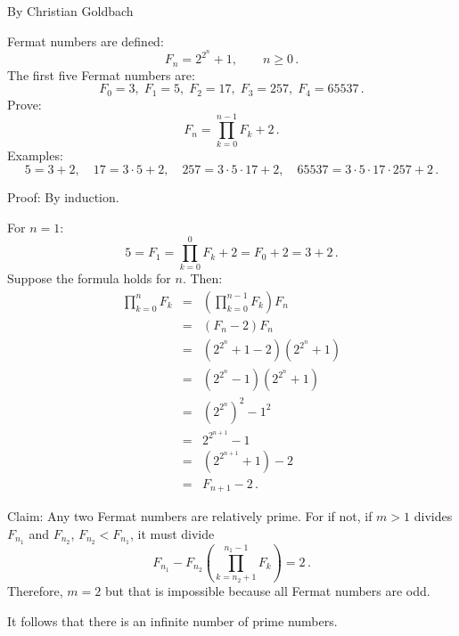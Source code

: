 \documentclass[11pt,a4paper]{report}
\begin{document}
\thispagestyle{empty}

By Christian Goldbach

Fermat numbers are defined:
\[
F_n=2^{2^n}+1,\quad\quad n\geq 0\,.
\]
The first five Fermat numbers are:
\[
F_0=3,\;F_1=5,\;F_2=17,\;F_3=257,\;F_4=65537\,.
\]
Prove:
\[
F_n = \prod_{k=0}^{n-1} F_k + 2\,.
\]
Examples:
\[
5=3+2,\quad 17=3\cdot 5+2,\quad 257=3\cdot 5\cdot 17+2,\quad 65537=3\cdot 5\cdot 17\cdot 257+2\,.
\]

Proof: By induction.

For $n=1$:
\[
5=F_1=\prod_{k=0}^{0} F_k + 2=F_0+2=3+2\,.
\]
Suppose the formula holds for $n$. Then:
\begin{eqnarray*}
\prod_{k=0}^{n}F_k
&=&(\prod_{k=0}^{n-1}F_k) F_n \\
&=& (F_n-2)F_n\\
&=& (2^{2^n}+1-2)(2^{2^n}+1)\\
&=&(2^{2^n}-1)(2^{2^n}+1)\\
&=& (2^{2^n})^2-1^2\\
&=& 2^{2^{n+1}}-1\\
&=& (2^{2^{n+1}}+1)-2\\
&=&F_{n+1}-2\,.
\end{eqnarray*}


Claim: Any two Fermat numbers are relatively prime. For if not, if $m>1$ divides $F_{n_1}$ and $F_{n_2}$, $F_{n_2} < F_{n_1}$, it must divide
\[
F_{n_1} - F_{n_2}\left(\prod_{k=n_2+1}^{n_1-1}F_k\right) = 2\,.
\]
Therefore, $m=2$ but that is impossible because all Fermat numbers are odd.

It follows that there is an infinite number of prime numbers.
\end{document}
